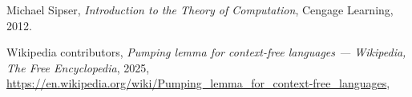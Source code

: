 \documentclass{article}
\begin{document}
\begin{thebibliography}{9}

Michael Sipser,
\textit{Introduction to the Theory of Computation},
Cengage Learning, 2012.

Wikipedia contributors,
\textit{Pumping lemma for context-free languages --- Wikipedia, The Free Encyclopedia},
2025,
\url{https://en.wikipedia.org/wiki/Pumping_lemma_for_context-free_languages},


\end{thebibliography}
\end{document}
